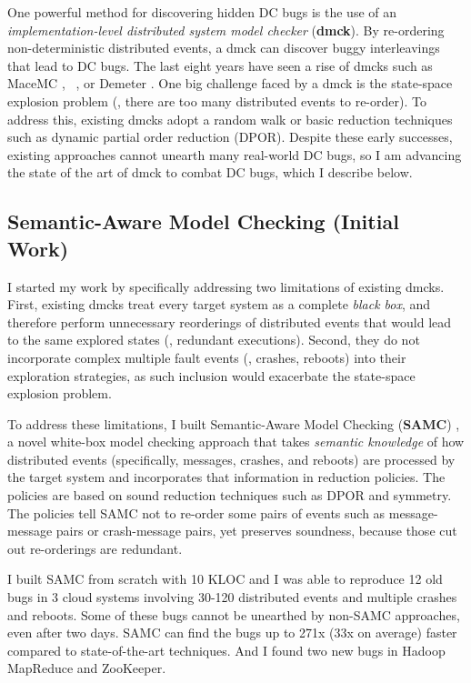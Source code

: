 \documentclass[11pt]{article}
\begin{document}
One powerful method for discovering hidden DC bugs is the use of an
\textit{implementation-level distributed system model checker} (\textbf{dmck}).
By re-ordering non-deterministic distributed events, a dmck can discover buggy
interleavings that lead to DC bugs. The last eight years have seen a rise of
dmcks such as MaceMC \cite{Killian+07-LifeDeathMaceMC}, \modist\
\cite{Yang+09-Modist}, or Demeter \cite{Guo+11-Demeter}. One big challenge faced
by a dmck is the state-space explosion problem (\ie, there are too many
distributed events to re-order). To address this, existing dmcks adopt a random
walk or basic reduction techniques such as dynamic partial order reduction
(DPOR). Despite these early successes, existing approaches cannot unearth many
real-world DC bugs, so I am advancing the state of the art of dmck to combat DC
bugs, which I describe below.

\subsection{Semantic-Aware Model Checking (Initial Work)} 

I started my work by specifically addressing two limitations of existing dmcks.
First, existing dmcks treat every target system as a complete \textit{black
box}, and therefore perform unnecessary reorderings of distributed events that
would lead to the same explored states (\ie, redundant executions). Second,
they do not incorporate complex multiple fault events (\eg, crashes, reboots)
into their exploration strategies, as such inclusion would exacerbate the
state-space explosion problem.

To address these limitations, I built Semantic-Aware Model Checking
(\textbf{SAMC})
\cite{Leesatapornwongsa+15-SamcIssta,Leesatapornwongsa+14-Samc}, a novel
white-box model checking approach that takes \textit{semantic knowledge} of how
distributed events (specifically, messages, crashes, and reboots) are processed
by the target system and incorporates that information in reduction policies.
The policies are based on sound reduction techniques such as DPOR and symmetry.
The policies tell SAMC not to re-order some pairs of events such as
message-message pairs or crash-message pairs, yet preserves soundness, because
those cut out re-orderings are redundant.

I built SAMC from scratch with 10 KLOC and I was able to reproduce 12 old bugs
in 3 cloud systems involving 30-120 distributed events and multiple crashes and
reboots. Some of these bugs cannot be unearthed by non-SAMC approaches, even
after two days. SAMC can find the bugs up to 271x (33x on average) faster
compared to state-of-the-art techniques. And I found two new bugs in Hadoop
MapReduce and ZooKeeper.
\end{document}
